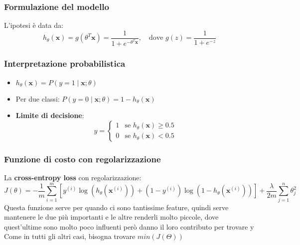 \documentclass[10pt,oneside,a4paper]{article}
\begin{document}
	\subsubsection{Formulazione del modello}
	L'ipotesi è data da:
	\[
	h_\theta(\mathbf{x}) = g(\theta^T \mathbf{x}) = \frac{1}{1 + e^{-\theta^T \mathbf{x}}}, \quad \text{dove } g(z) = \frac{1}{1+e^{-z}}
	\]
	\subsubsection{Interpretazione probabilistica}
	\begin{itemize}
		\item $h_\theta(\mathbf{x}) = P(y=1 \mid \mathbf{x}; \theta)$
		\item Per due classi: $P(y=0 \mid \mathbf{x}; \theta) = 1 - h_\theta(\mathbf{x})$
		\item \textbf{Limite di decisione}: 
		\[
		y = 
		\begin{cases}
			1 & \text{se } h_\theta(\mathbf{x}) \geq 0.5 \\
			0 & \text{se } h_\theta(\mathbf{x}) < 0.5
		\end{cases}
		\]
	\end{itemize}
	
	\subsubsection{Funzione di costo con regolarizzazione}
	La \textbf{cross-entropy loss} con regolarizzazione:
	\[
	J(\theta) = -\frac{1}{m} \sum_{i=1}^m \left[ y^{(i)} \log(h_\theta(\mathbf{x}^{(i)})) + (1-y^{(i)}) \log(1 - h_\theta(\mathbf{x}^{(i)})) \right] + \frac{\lambda}{2m} \sum_{j=1}^n \theta_j^2
	\]
	Questa funzione serve per quando ci sono tantissime feature, quindi serve mantenere le due più importanti e le altre renderli molto piccole, dove quest'ultime sono molto poco influenti però danno il loro contributo per trovare y\\
	Come in tutti gli altri casi, bisogna trovare $min(J(\Theta))$
	
\end{document}

